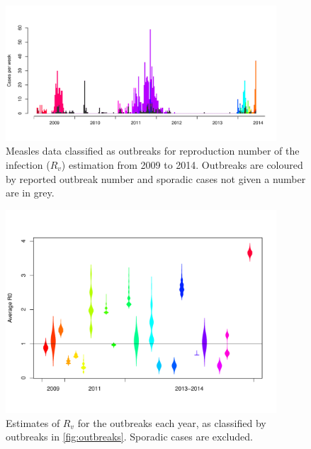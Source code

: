 \documentclass{article}
\begin{document}
\begin{figure}
\begin{center}
     \includegraphics[width=0.9\textwidth]{outbreaks_2009_2014.pdf}
     \end{center}
     \caption{Measles data classified as outbreaks for reproduction number of the infection ($R_v$) estimation from 2009 to 2014. Outbreaks are coloured by reported outbreak number and sporadic cases not given a number are in grey.}
     \label{fig:outbreaks}
\end{figure}

\begin{figure}
\begin{center}
     \includegraphics[width=0.9\textwidth]{averageR0_all_ob.pdf}
     \end{center}
     \caption{Estimates of $R_v$ for the outbreaks each year, as classified by outbreaks in \autoref{fig:outbreaks}. Sporadic cases are excluded.}
     \label{fig:r0}
\end{figure}
\end{document}
